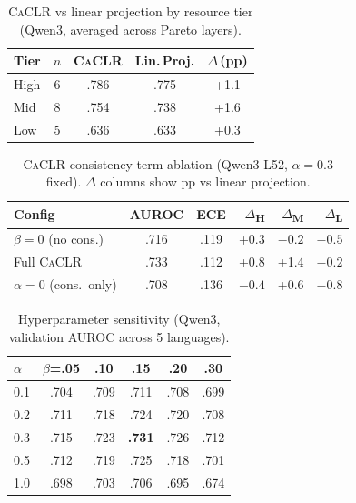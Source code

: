 \documentclass[11pt,a4paper]{article}
\newcommand{\caclr}{\textsc{CaCLR}}
\begin{document}
\begin{table}[t]
\centering
\small
\caption{\caclr{} vs linear projection by resource tier (Qwen3, averaged across Pareto layers).}
\label{tab:caclr_tier}
\begin{tabular}{lcccc}
\toprule
Tier & $n$ & \caclr{} & Lin.\,Proj. & $\Delta$\,(pp) \\
\midrule
High & 6 & .786 & .775 & +1.1 \\
Mid & 8 & .754 & .738 & +1.6 \\
Low & 5 & .636 & .633 & +0.3 \\
\bottomrule
\end{tabular}
\end{table}

\begin{table}[t]
\centering
\small
\caption{\caclr{} consistency term ablation (Qwen3 L52, $\alpha=0.3$ fixed). $\Delta$ columns show pp vs linear projection.}
\label{tab:ablation}
\begin{tabular}{lccrrr}
\toprule
Config & AUROC & ECE & $\Delta$\textsubscript{H} & $\Delta$\textsubscript{M} & $\Delta$\textsubscript{L} \\
\midrule
$\beta{=}0$ (no cons.) & .716 & .119 & +0.3 & $-0.2$ & $-0.5$ \\
Full \caclr{} & .733 & .112 & +0.8 & +1.4 & $-0.2$ \\
$\alpha{=}0$ (cons.\ only) & .708 & .136 & $-0.4$ & +0.6 & $-0.8$ \\
\bottomrule
\end{tabular}
\end{table}

\begin{table}[t]
\centering
\small
\caption{Hyperparameter sensitivity (Qwen3, validation AUROC across 5 languages).}
\label{tab:hyperparam}
\begin{tabular}{lccccc}
\toprule
$\alpha$ & $\beta$=.05 & .10 & .15 & .20 & .30 \\
\midrule
0.1 & .704 & .709 & .711 & .708 & .699 \\
0.2 & .711 & .718 & .724 & .720 & .708 \\
0.3 & .715 & .723 & \textbf{.731} & .726 & .712 \\
0.5 & .712 & .719 & .725 & .718 & .701 \\
1.0 & .698 & .703 & .706 & .695 & .674 \\
\bottomrule
\end{tabular}
\end{table}

\end{document}
